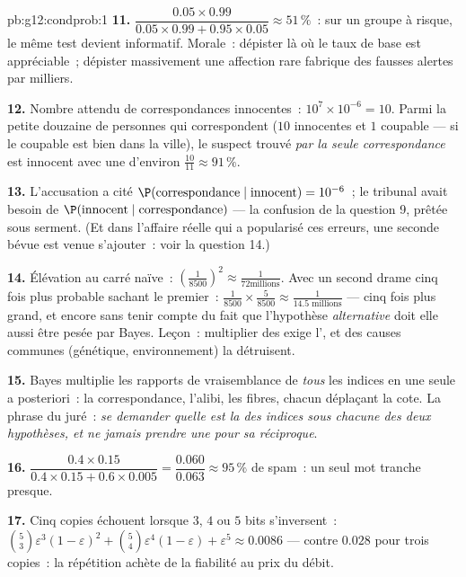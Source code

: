 \begin{solution}{pb:g12:condprob:1}
\textbf{11.} $\dfrac{0.05 \times 0.99}{0.05 \times 0.99 +
0.95 \times 0.05} \approx 51\,\%$~: sur un groupe à risque, le même
test devient informatif. Morale~: dépister là où le taux de base
est appréciable~; dépister massivement une affection rare fabrique
des fausses alertes par milliers.

\textbf{12.} Nombre attendu de correspondances innocentes~:
$10^7 \times 10^{-6} = 10$. Parmi la petite douzaine de personnes
qui correspondent ($10$ innocentes et $1$ coupable --- si le
coupable est bien dans la ville), le suspect trouvé \emph{par la
seule correspondance} est innocent avec une  d'environ
$\frac{10}{11} \approx 91\,\%$.

\textbf{13.} L'accusation a cité
$\P(\text{correspondance} \mid \text{innocent}) = 10^{-6}$~; le
tribunal avait besoin de
$\P(\text{innocent} \mid \text{correspondance})$ --- la confusion
de la question 9, prêtée sous serment. (Et dans l'affaire réelle
qui a popularisé ces erreurs, une seconde bévue est venue
s'ajouter~: voir la question 14.)

\textbf{14.} Élévation au carré naïve~:
$\left(\frac{1}{8500}\right)^2 \approx \frac{1}{72 \text{
millions}}$. Avec un second drame cinq fois plus probable sachant
le premier~: $\frac{1}{8500} \times \frac{5}{8500} \approx
\frac{1}{14.5 \text{ millions}}$ --- cinq fois plus grand, et
encore sans tenir compte du fait que l'hypothèse \emph{alternative}
doit elle aussi être pesée par Bayes. Leçon~: multiplier des
 exige l', et des causes communes
(génétique, environnement) la détruisent.

\textbf{15.} Bayes multiplie les rapports de vraisemblance de
\emph{tous} les indices en une seule  a posteriori~: la
correspondance, l'alibi, les fibres, chacun déplaçant la cote. La
phrase du juré~: \emph{se demander quelle est la  des
indices sous chacune des deux hypothèses, et ne jamais prendre une
 pour sa réciproque}.

\textbf{16.} $\dfrac{0.4 \times 0.15}{0.4 \times 0.15 +
0.6 \times 0.005} = \dfrac{0.060}{0.063} \approx 95\,\%$ de spam~:
un seul mot tranche presque.

\textbf{17.} Cinq copies échouent lorsque $3$, $4$ ou $5$ bits
s'inversent~:
$\binom53 \varepsilon^3(1-\varepsilon)^2 + \binom54
\varepsilon^4 (1 - \varepsilon) + \varepsilon^5 \approx 0.0086$ ---
contre $0.028$ pour trois copies~: la répétition achète de la
fiabilité au prix du débit.


\end{solution}
